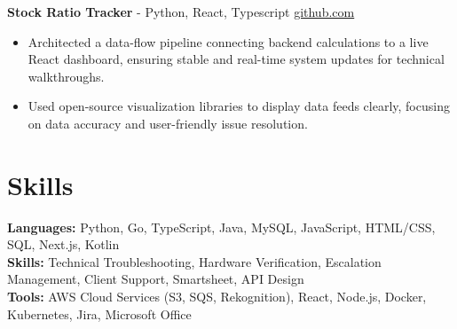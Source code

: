 \documentclass[11pt]{article}       %
\begin{document}

\textbf{Stock Ratio Tracker}{ - Python, React, Typescript} \hfill \href{https://github.com/Monica20030707/tradingDashboard-UI}{github.com} \\
\vspace{-9pt}
\begin{itemize}
  \item Architected a data-flow pipeline connecting backend calculations to a live React dashboard, ensuring stable and real-time system updates for technical walkthroughs. 
  \item Used open-source visualization libraries to display data feeds clearly, focusing on data accuracy and user-friendly issue resolution.
\end{itemize}

\vspace{-18.5pt}

\section*{Skills}
\textbf{Languages:} Python, Go, TypeScript, Java, MySQL, JavaScript, HTML/CSS, SQL, Next.js, Kotlin\\
\textbf{Skills:} Technical Troubleshooting, Hardware Verification, Escalation Management, Client Support, Smartsheet, API Design\\
\textbf{Tools:} AWS Cloud Services (S3, SQS, Rekognition), React, Node.js, Docker, Kubernetes, Jira, Microsoft Office\\

\vspace{-6.5pt}
\end{document}
